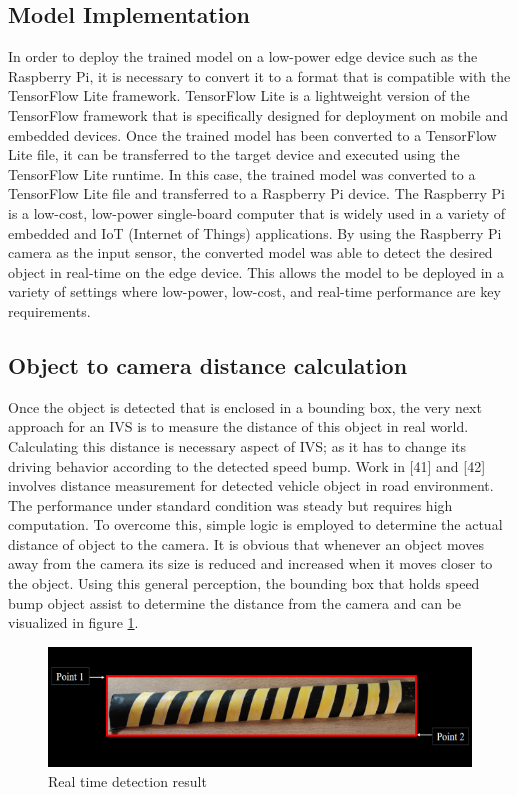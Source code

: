 \subsection{Model Implementation}
In order to deploy the trained model on a low-power edge device such as the Raspberry Pi, it is necessary to convert it to a format that is compatible with the TensorFlow Lite framework. TensorFlow Lite is a lightweight version of the TensorFlow framework that is specifically designed for deployment on mobile and embedded devices. Once the trained model has been converted to a TensorFlow Lite file, it can be transferred to the target device and executed using the TensorFlow Lite runtime.
\noindent
In this case, the trained model was converted to a TensorFlow Lite file and transferred to a Raspberry Pi device. The Raspberry Pi is a low-cost, low-power single-board computer that is widely used in a variety of embedded and IoT (Internet of Things) applications. By using the Raspberry Pi camera as the input sensor, the converted model was able to detect the desired object in real-time on the edge device. This allows the model to be deployed in a variety of settings where low-power, low-cost, and real-time performance are key requirements.
\subsection{Object to camera distance calculation}
Once the object is detected that is enclosed in a bounding
box, the very next approach for an IVS is to measure the
distance of this object in real world. Calculating this distance is necessary aspect of IVS; as it has to change its driving behavior according to the detected speed bump. Work in
[41] and [42] involves distance measurement for detected
vehicle object in road environment. The performance under
standard condition was steady but requires high computation.
To overcome this, simple logic is employed to determine the
actual distance of object to the camera. It is obvious that
whenever an object moves away from the camera its size is
reduced and increased when it moves closer to the object.
Using this general perception, the bounding box that holds
speed bump object assist to determine the distance from the
camera and can be visualized in figure \ref{fig:dist_calc}.
\begin{figure}[H]
    \centering
    \includegraphics[]{Figures/chapter3/dist_calc.png}
    \caption{Real time detection result}
    \label{fig:dist_calc}
\end{figure}

